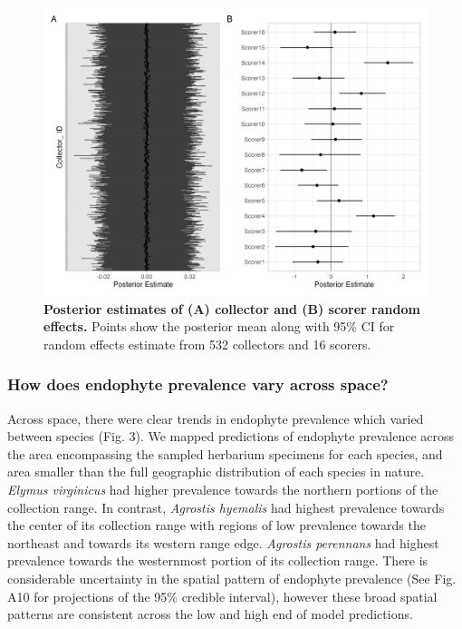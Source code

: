 \documentclass[11pt]{article}
\begin{document}
\begin{figure}[H]
	\label{fig:random_fx}
	\centering
	\includegraphics[width = .8\linewidth]{random_fx_plot.png}
	\caption{\textbf{Posterior estimates of (A) collector and (B) scorer random effects.} Points show the posterior mean along with 95\% CI for random effects estimate from 532 collectors and 16 scorers.}
\end{figure}


\subsubsection*{How does endophyte prevalence vary across space?}
Across space, there were clear trends in endophyte prevalence which varied between species (Fig. 3).
We mapped predictions of endophyte prevalence across the area encompassing the sampled herbarium specimens for each species, and area smaller than the full geographic distribution of each species in nature.
\emph{Elymus virginicus} had higher prevalence towards the northern portions of the collection range. 
In contrast, \emph{Agrostis hyemalis} had highest prevalence towards the center of its collection range with regions of low prevalence towards the northeast and towards its western range edge.
\emph{Agrostis perennans} had  highest prevalence towards the westernmost portion of its collection range.
There is considerable uncertainty in the spatial pattern of endophyte prevalence (See Fig. A10 for projections of the 95\% credible interval), however these broad spatial patterns are consistent across the low and high end of model predictions. 
\end{document}
